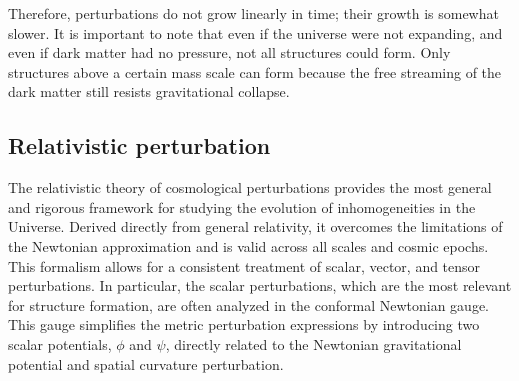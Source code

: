 Therefore, perturbations do not grow linearly in time; their growth is somewhat slower.
It is important to note that even if the universe were not expanding, and even if dark matter had no pressure, not all structures could form. Only structures above a certain mass scale can form because the free streaming of the dark matter still resists gravitational collapse.\\


\subsection{Relativistic perturbation}

The relativistic theory of cosmological perturbations provides the most general and rigorous framework for studying the evolution of inhomogeneities in the Universe. Derived directly from general relativity, it overcomes the limitations of the Newtonian approximation and is valid across all scales and cosmic epochs. This formalism allows for a consistent treatment of scalar, vector, and tensor perturbations.
In particular, the scalar perturbations, which are the most relevant for structure formation, are often analyzed in the conformal Newtonian gauge. This gauge simplifies the metric perturbation expressions by introducing two scalar potentials, $\phi$ and $\psi$, directly related to the Newtonian gravitational potential and spatial curvature perturbation. 

